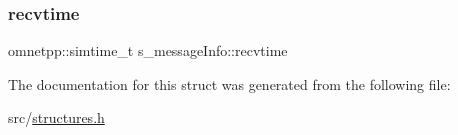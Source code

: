 \mbox{\label{structs__messageInfo_a3600b24205dc07ce06774af44976c107}} 
\subsubsection{\texorpdfstring{recvtime}{recvtime}}
{\footnotesize\ttfamily omnetpp\+::simtime\+\_\+t s\+\_\+message\+Info\+::recvtime}



The documentation for this struct was generated from the following file\+:\begin{DoxyCompactItemize}
\item 
src/\hyperlink{structures_8h}{structures.\+h}\end{DoxyCompactItemize}
